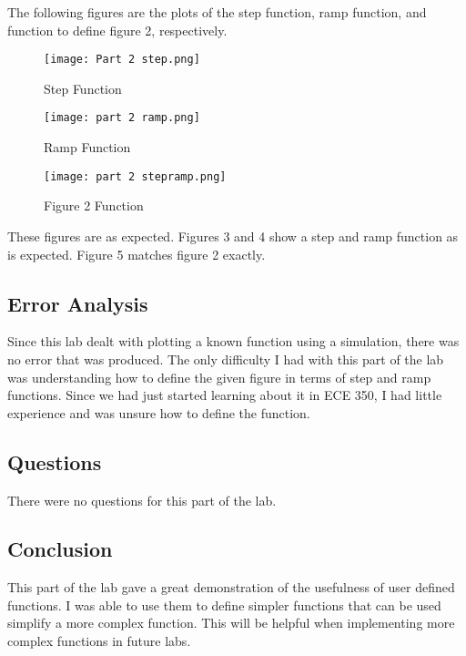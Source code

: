 \documentclass[12pt, titlepage]{article}
\begin{document}
            The following figures are the plots of the step function, ramp function, and function to define figure 2, respectively. 
            \newpage
            \begin{figure}[h!]
                \centering
                \texttt{[image: Part 2 step.png]}
                \caption{Step Function}
                \label{fig:my_label}
            \end{figure}

            \begin{figure}[h!]
                \centering
                \texttt{[image: part 2 ramp.png]}
                \caption{Ramp Function}
                \label{fig:my_label}
            \end{figure}
            \newpage
            \begin{figure}[h!]
                \centering
                \texttt{[image: part 2 stepramp.png]}
                \caption{Figure 2 Function}
                \label{fig:my_label}
            \end{figure}
            
            These figures are as expected.  Figures 3 and 4 show a step and ramp function as is expected.  Figure 5 matches figure 2 exactly.
            
            
            \newpage
            \subsection{Error Analysis}
             Since this lab dealt with plotting a known function using a simulation, there was no error that was produced.  The only difficulty I had with this part of the lab was understanding how to define the given figure in terms of step and ramp functions.  Since we had just started learning about it in ECE 350, I had little experience and was unsure how to define the function.
             
             \subsection{Questions}
             There were no questions for this part of the lab.
             
             \subsection{Conclusion}
             This part of the lab gave a great demonstration of the usefulness of user defined functions.  I was able to use them to define simpler functions that can be used simplify a more complex function.  This will be helpful when implementing more complex functions in future labs.
             \clearpage
\end{document}

